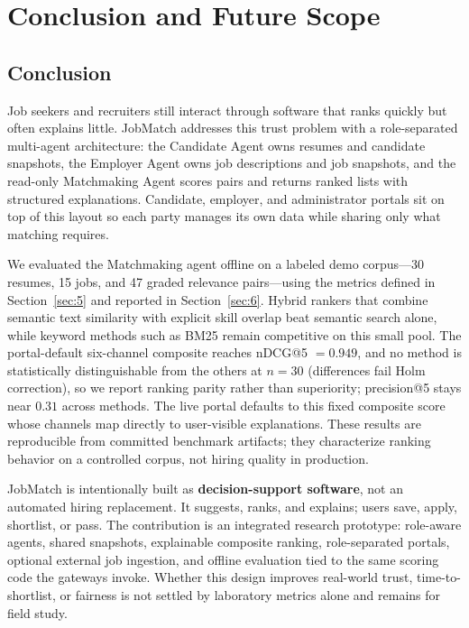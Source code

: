 \section{Conclusion and Future Scope}\label{sec:7}

\subsection{Conclusion}\label{sec:7-conclusion}

Job seekers and recruiters still interact through software that ranks quickly but often explains little.
JobMatch addresses this trust problem with a role-separated multi-agent architecture: the Candidate Agent owns resumes and candidate snapshots, the Employer Agent owns job descriptions and job snapshots, and the read-only Matchmaking Agent scores pairs and returns ranked lists with structured explanations.
Candidate, employer, and administrator portals sit on top of this layout so each party manages its own data while sharing only what matching requires.

We evaluated the Matchmaking agent offline on a labeled demo corpus---30 resumes, 15 jobs, and 47 graded relevance pairs---using the metrics defined in Section~\ref{sec:5} and reported in Section~\ref{sec:6}.
Hybrid rankers that combine semantic text similarity with explicit skill overlap beat semantic search alone, while keyword methods such as BM25 remain competitive on this small pool.
The portal-default six-channel composite reaches nDCG@5 $= 0.949$, and no method is statistically distinguishable from the others at $n{=}30$ (differences fail Holm correction), so we report ranking parity rather than superiority; precision@5 stays near $0.31$ across methods.
The live portal defaults to this fixed composite score whose channels map directly to user-visible explanations.
These results are reproducible from committed benchmark artifacts; they characterize ranking behavior on a controlled corpus, not hiring quality in production.

JobMatch is intentionally built as \textbf{decision-support software}, not an automated hiring replacement.
It suggests, ranks, and explains; users save, apply, shortlist, or pass.
The contribution is an integrated research prototype: role-aware agents, shared snapshots, explainable composite ranking, role-separated portals, optional external job ingestion, and offline evaluation tied to the same scoring code the gateways invoke.
Whether this design improves real-world trust, time-to-shortlist, or fairness is not settled by laboratory metrics alone and remains for field study.

